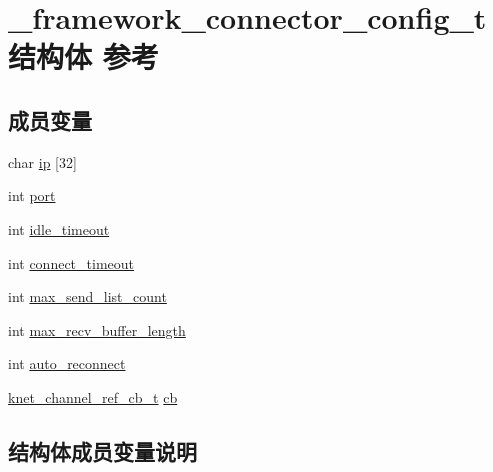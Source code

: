 \hypertarget{a00011}{}\section{\+\_\+framework\+\_\+connector\+\_\+config\+\_\+t结构体 参考}
\label{a00011}
\subsection*{成员变量}
\begin{DoxyCompactItemize}
\item 
char \hyperlink{a00011_a09a135e761eb026e64952e76ca193c1b_a09a135e761eb026e64952e76ca193c1b}{ip} \mbox{[}32\mbox{]}
\item 
int \hyperlink{a00011_a5427527be42630baf3fc0497e74e4d4d_a5427527be42630baf3fc0497e74e4d4d}{port}
\item 
int \hyperlink{a00011_a103e36450fc30baa72acc26b7efd5b98_a103e36450fc30baa72acc26b7efd5b98}{idle\+\_\+timeout}
\item 
int \hyperlink{a00011_a02f7315d98e5e2872fde99130da6b7c8_a02f7315d98e5e2872fde99130da6b7c8}{connect\+\_\+timeout}
\item 
int \hyperlink{a00011_ac6e964a4a4ca24a176016275955a4e05_ac6e964a4a4ca24a176016275955a4e05}{max\+\_\+send\+\_\+list\+\_\+count}
\item 
int \hyperlink{a00011_a7f803ef991aaf690e9b3585c423511d1_a7f803ef991aaf690e9b3585c423511d1}{max\+\_\+recv\+\_\+buffer\+\_\+length}
\item 
int \hyperlink{a00011_a1e36fbcd619adeff0b334ed609b8685e_a1e36fbcd619adeff0b334ed609b8685e}{auto\+\_\+reconnect}
\item 
\hyperlink{a00051_a8a7d96123ef4565c6d08fe58a10476a9_a8a7d96123ef4565c6d08fe58a10476a9}{knet\+\_\+channel\+\_\+ref\+\_\+cb\+\_\+t} \hyperlink{a00011_ab08fced06b6e8f0dda28e4f1d09ad027_ab08fced06b6e8f0dda28e4f1d09ad027}{cb}
\end{DoxyCompactItemize}


\subsection{结构体成员变量说明}
\hypertarget{a00011_a1e36fbcd619adeff0b334ed609b8685e_a1e36fbcd619adeff0b334ed609b8685e}{}
